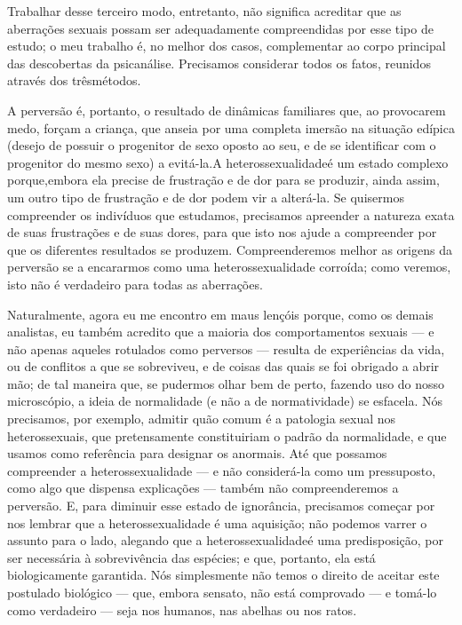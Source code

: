 Trabalhar desse terceiro modo, entretanto, não significa acreditar
que as aberrações sexuais possam ser adequadamente compreendidas por
esse tipo de estudo; o meu trabalho é, no melhor dos casos,
complementar ao corpo principal das descobertas da psicanálise.
Precisamos considerar todos os fatos, reunidos através dos três\idxpsica[|)]
métodos.

A perversão é, portanto, o resultado de dinâmicas familiares que, ao
provocarem medo, forçam a criança, que anseia por uma completa imersão
na situação edípica\idxconfe{} (desejo de possuir o progenitor de sexo oposto ao
seu, e de se identificar com o progenitor do mesmo sexo) a evitá-la.\idxinflu[|)] A
heterossexualidade\idxhetero[|(] é um estado complexo porque,\idxangu[|(] embora ela precise de
frustração e de dor para se produzir, ainda assim, um outro tipo de
frustração e de dor podem vir a alterá-la.\idxheteroadqu{} Se quisermos compreender os
indivíduos que estudamos, precisamos apreender a natureza exata de suas
frustrações e de suas dores, para que isto nos ajude a compreender por
que os diferentes resultados se produzem. Compreenderemos melhor as
origens da perversão se a encararmos como uma heterossexualidade
corroída; como veremos, isto não é verdadeiro para todas as aberrações.

Naturalmente, agora eu me encontro em maus lençóis porque, como os
demais analistas, eu também acredito que a maioria dos comportamentos
sexuais --- e não apenas aqueles rotulados como perversos --- resulta de
experiências da vida, ou de conflitos a que se sobreviveu, e de coisas
das quais se foi obrigado a abrir mão; de tal maneira que, se pudermos
olhar bem de perto, fazendo uso do nosso microscópio, a ideia de
normalidade\idxnorma{} (e não a de normatividade)\idxpervnorma{} se esfacela. Nós precisamos, por
exemplo, admitir quão comum é a patologia sexual nos heterossexuais,
que pretensamente constituiriam o padrão da normalidade, e que usamos
como referência para designar os anormais. Até que possamos
compreender a heterossexualidade --- e não considerá-la como um
pressuposto, como algo que dispensa explicações --- também não
compreenderemos a perversão. E, para diminuir esse estado de
ignorância, precisamos começar por nos lembrar que a heterossexualidade
é uma aquisição; não podemos varrer o assunto para o lado, alegando que
a heterossexualidade\idxhetero[|)] é uma predisposição, por ser necessária à
sobrevivência das espécies; e que, portanto, ela está biologicamente
garantida. Nós simplesmente não temos o direito de aceitar este
postulado biológico --- que, embora sensato, não está comprovado --- e
tomá-lo como verdadeiro --- seja nos humanos, nas abelhas ou nos ratos.

